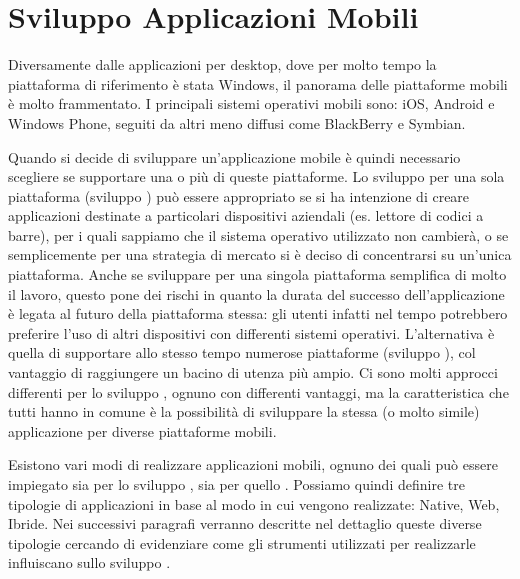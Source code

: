 \chapter{Sviluppo Applicazioni Mobili}
\label{chap:sam}
    Diversamente dalle applicazioni per desktop, dove per molto tempo la
    piattaforma di riferimento è stata Windows, il panorama delle piattaforme
    mobili è molto frammentato. I principali sistemi operativi mobili sono: iOS,
    Android e Windows Phone, seguiti da altri meno diffusi come BlackBerry e
    Symbian.

    Quando si decide di sviluppare un'applicazione mobile è quindi necessario
    scegliere se supportare una o più di queste piattaforme. Lo sviluppo per
    una sola piattaforma (sviluppo \singleplat{}) può essere appropriato se si ha
    intenzione di creare applicazioni destinate a particolari dispositivi
    aziendali (es. lettore di codici a barre), per i quali sappiamo che il
    sistema operativo utilizzato non cambierà, o se semplicemente per una
    strategia di mercato si è deciso di concentrarsi su un'unica piattaforma.
    Anche se sviluppare per una singola piattaforma semplifica di
    molto il lavoro, questo pone dei rischi in quanto la durata del successo
    dell'applicazione è legata al futuro della piattaforma stessa: gli utenti
    infatti nel tempo potrebbero preferire l'uso di altri dispositivi con
    differenti sistemi operativi.
    L'alternativa è quella di supportare allo stesso tempo numerose piattaforme
    (sviluppo \crossplat{}), col vantaggio di raggiungere un bacino di utenza
    più ampio.
    Ci sono molti approcci differenti per lo sviluppo \crossplat{}, ognuno con
    differenti vantaggi, ma la caratteristica che tutti hanno in comune è la
    possibilità di sviluppare la stessa (o molto simile) applicazione per
    diverse piattaforme mobili.

    Esistono vari modi di realizzare applicazioni mobili, ognuno dei quali può
    essere impiegato sia per lo sviluppo \singleplat{}, sia per quello
    \crossplat{}.
    Possiamo quindi definire tre tipologie di applicazioni in base al modo in
    cui vengono realizzate: Native, Web, Ibride.
    Nei successivi paragrafi verranno descritte nel dettaglio queste diverse
    tipologie cercando di evidenziare come gli strumenti utilizzati per
    realizzarle influiscano sullo sviluppo \crossplat{}.

